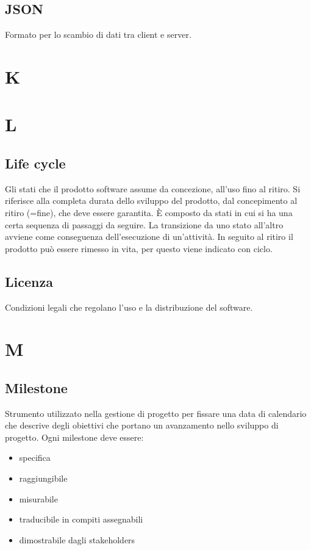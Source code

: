 \documentclass[a4paper,12pt]{article}
\begin{document}
\subsection{JSON}
Formato per lo scambio di dati tra client e server.

\section{K}

\section{L}

\subsection{Life cycle}
Gli stati che il prodotto software assume da concezione, all’uso fino al ritiro.  
Si riferisce alla completa durata dello sviluppo del prodotto, dal concepimento al ritiro (=fine), che deve essere garantita.  
È composto da stati in cui si ha una certa sequenza di passaggi da seguire. La transizione da uno stato all’altro avviene come conseguenza dell’esecuzione di un’attività.  
In seguito al ritiro il prodotto può essere rimesso in vita, per questo viene indicato con ciclo.

\subsection{Licenza}
Condizioni legali che regolano l’uso e la distribuzione del software.

\section{M}

\subsection{Milestone}
Strumento utilizzato nella gestione di progetto per fissare una data di calendario che descrive degli obiettivi che portano un avanzamento nello sviluppo di progetto.  
Ogni milestone deve essere:
\begin{itemize}
\item specifica 
\item raggiungibile
\item misurabile
\item traducibile in compiti assegnabili
\item dimostrabile dagli stakeholders
\end{itemize}
\end{document}
